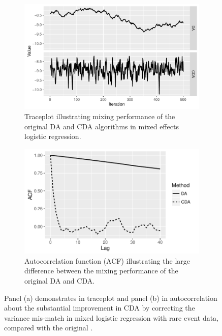\documentclass[10pt]{article}
\begin{document}
\begin{figure}[H]
  \begin{subfigure}[b]{0.49\textwidth}
 \includegraphics[width=1\textwidth]{logit_random_trace_plot.pdf}
  \caption{Traceplot illustrating mixing performance of the original DA and CDA algorithms in mixed effects logistic regression.}
\end{subfigure}
  \hfill
   \begin{subfigure}[b]{0.49\textwidth}
 \includegraphics[width=1\textwidth]{logit_random_acf.pdf}
  \caption{Autocorrelation function (ACF) illustrating the large difference between the mixing performance of the original DA and CDA.}
\end{subfigure}
 \caption{Panel (a) demonstrates in traceplot and panel (b) in autocorrelation about the substantial improvement in CDA by correcting the variance mis-match in mixed logistic regression with rare event data, compared with the original \citep{polson2013bayesian}.}
    \label{logit_random_mixing}
 \end{figure}
 
\end{document}
